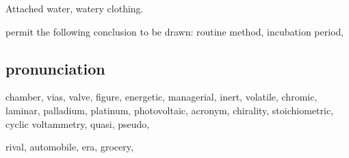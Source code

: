 Attached water, watery clothing. 

permit the following conclusion to be drawn: routine method, incubation period, 


\subsection{pronunciation}

chamber, vias, valve, figure, energetic, managerial, inert, volatile, chromic,
laminar, palladium, platinum, photovoltaic, acronym, chirality, stoichiometric, cyclic voltammetry, quasi, pseudo, 

rival, automobile, era, grocery, 